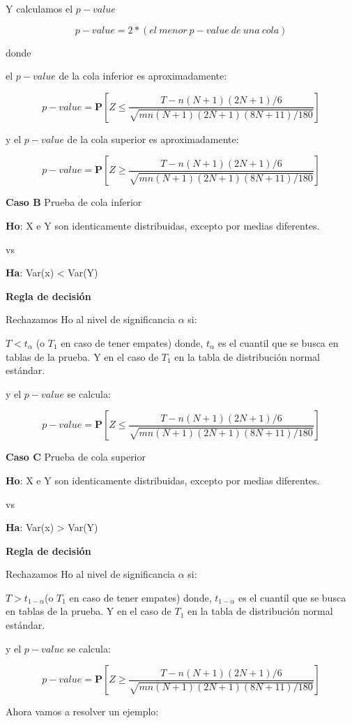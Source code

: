 \documentclass[a4paper,oneside,openany]{book}
\begin{document}
Y calculamos el \(p-value\)

\[p-value= 2*(el \ menor\ p-value\ de\ una\ cola)\]

donde

el \(p-value\) de la cola inferior es aproximadamente:

\[ p-value=\mathbf{P}\left[Z\leq\frac{T-n(N+1)(2N+1)/6}{\sqrt{mn(N+1)(2N+1)(8N+11)/180}}\right]\]

y el \(p-value\) de la cola superior es aproximadamente:

\[p-value=\mathbf{P}\left[Z\geq\frac{T-n(N+1)(2N+1)/6}{\sqrt{mn(N+1)(2N+1)(8N+11)/180}}\right]\]

\textbf{Caso B} Prueba de cola inferior

\textbf{Ho}: X e Y son identicamente distribuidas, excepto por medias
diferentes.

vs

\textbf{Ha}: Var(x) \textless{} Var(Y)

\textbf{Regla de decisión}

Rechazamos Ho al nivel de significancia \(\alpha\) si:

\(T<t_\alpha\) (o \(T_1\) en caso de tener empates) donde, \(t_\alpha\)
es el cuantil que se busca en tablas de la prueba. Y en el caso de
\(T_{1}\) en la tabla de distribución normal estándar.

y el \(p-value\) se calcula:

\[ p-value= \mathbf{P}\left[Z\leq\frac{T-n(N+1)(2N+1)/6}{\sqrt{mn(N+1)(2N+1)(8N+11)/180}}\right]\]

\textbf{Caso C} Prueba de cola superior

\textbf{Ho}: X e Y son identicamente distribuidas, excepto por medias
diferentes.

vs

\textbf{Ha}: Var(x) \textgreater{} Var(Y)

\textbf{Regla de decisión}

Rechazamos Ho al nivel de significancia \(\alpha\) si:

\(T>t_{1-\alpha}\)(o \(T_1\) en caso de tener empates) donde,
\(t_{1-\alpha}\) es el cuantil que se busca en tablas de la prueba. Y en
el caso de \(T_{1}\) en la tabla de distribución normal estándar.

y el \(p-value\) se calcula:

\[p-value=\mathbf{P}\left[Z\geq\frac{T-n(N+1)(2N+1)/6}{\sqrt{mn(N+1)(2N+1)(8N+11)/180}}\right]\]

Ahora vamos a resolver un ejemplo:
\end{document}
